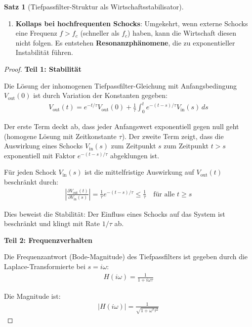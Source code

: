 \documentclass[a4paper,12pt,twoside]{report}
\theoremstyle{definition}
\newtheorem{satz}{Satz}
\begin{document}
\begin{satz}[Tiefpassfilter-Struktur als Wirtschaftsstabilisator]
\begin{enumerate}
\item \textbf{Kollaps bei hochfrequenten Schocks}: Umgekehrt, wenn externe Schocks eine Frequenz $f > f_c$ (schneller als $f_c$) haben, kann die Wirtschaft diesen nicht folgen. Es entstehen \textbf{Resonanzphänomene}, die zu exponentieller Instabilität führen.

\end{enumerate}

\end{satz}

\begin{proof}

\textbf{Teil 1: Stabilität}

Die Lösung der inhomogenen Tiefpassfilter-Gleichung mit Anfangsbedingung $V_{\text{out}}(0)$ ist durch Variation der Konstanten gegeben:
\begin{align}
V_{\text{out}}(t) = e^{-t/\tau} V_{\text{out}}(0) + \frac{1}{\tau} \int_0^t e^{-(t-s)/\tau} V_{\text{in}}(s) \, ds
\end{align}

Der erste Term deckt ab, dass jeder Anfangswert exponentiell gegen null geht (homogene Lösung mit Zeitkonstante $\tau$). Der zweite Term zeigt, dass die Auswirkung eines Schocks $V_{\text{in}}(s)$ zum Zeitpunkt $s$ zum Zeitpunkt $t > s$ exponentiell mit Faktor $e^{-(t-s)/\tau}$ abgeklungen ist.

Für jeden Schock $V_{\text{in}}(s)$ ist die mittelfristige Auswirkung auf $V_{\text{out}}(t)$ beschränkt durch:
\begin{align}
\left| \frac{\partial V_{\text{out}}(t)}{\partial V_{\text{in}}(s)} \right| = \frac{1}{\tau} e^{-(t-s)/\tau} \leq \frac{1}{\tau} \quad \text{für alle } t \geq s
\end{align}

Dies beweist die Stabilität: Der Einfluss eines Schocks auf das System ist beschränkt und klingt mit Rate $1/\tau$ ab.

\textbf{Teil 2: Frequenzverhalten}

Die Frequenzantwort (Bode-Magnitude) des Tiefpassfilters ist gegeben durch die Laplace-Transformierte bei $s = i\omega$:
\begin{align}
H(i\omega) = \frac{1}{1 + i\omega\tau}
\end{align}

Die Magnitude ist:
\begin{align}
|H(i\omega)| = \frac{1}{\sqrt{1 + \omega^2\tau^2}}
\end{align}


\end{proof}
\end{document}
